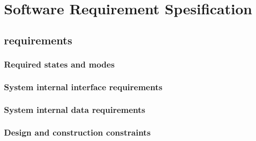 \section{Software Requirement Spesification}

\subsection{requirements}

\subsubsection*{Required states and modes}

\subsubsection*{System internal interface requirements}

\subsubsection*{System internal data requirements}

\subsubsection*{Design and construction constraints}
